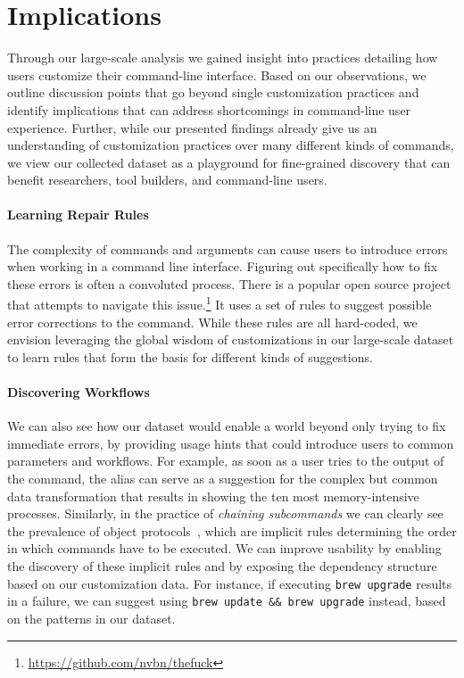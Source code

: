 \section{Implications}

Through our large-scale analysis 
we gained insight into practices detailing how users customize their command-line interface.
Based on our observations, we outline discussion points that go beyond single customization practices and identify implications that can address shortcomings in command-line user experience.
Further, while our presented findings already give us an understanding of customization practices over many different kinds of commands, we view our collected dataset as a playground for fine-grained discovery that can benefit researchers, tool builders, and command-line users.

\paragraph*{\bf Learning Repair Rules}

The complexity of commands and arguments can cause users to introduce errors when working in a command line interface.
Figuring out specifically how to fix these errors is often a convoluted process.
There is a popular open source project that attempts to navigate this issue.\footnote{\url{https://github.com/nvbn/thefuck}}
It uses a set of rules to suggest possible error corrections to the command.
While these rules are all hard-coded, we envision leveraging the global wisdom of customizations in our large-scale dataset to learn rules that form the basis for different kinds of suggestions.

\paragraph*{\bf Discovering Workflows}
We can also see how our dataset would enable a world beyond only trying to fix immediate errors, by providing usage hints that could introduce users to common parameters and workflows.
For example, as soon as a user tries to  the output of the  command, the alias  can serve as a suggestion for the complex but common data transformation that results in showing the ten most memory-intensive processes.
Similarly, in the practice of \emph{chaining subcommands} we can clearly see the prevalence of object protocols~\cite{beckman:11}, which are implicit rules determining the order in which commands have to be executed.
We can improve usability by enabling the discovery of these implicit rules and by exposing the dependency structure based on our customization data.
For instance, if executing \verb|brew upgrade| results in a failure, we can suggest using \verb|brew update && brew upgrade| instead, based on the patterns in our dataset. 

